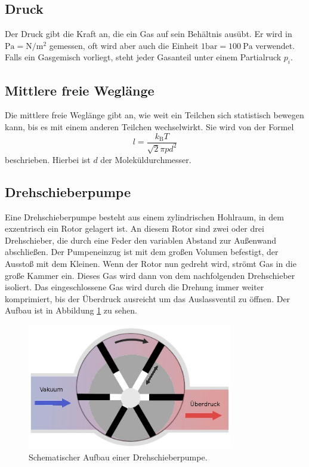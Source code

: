 \subsection{Druck}
Der Druck gibt die Kraft an, die ein Gas auf sein Behältnis ausübt. Er wird in $\si{\pascal}=\si{\newton \per \meter \squared}$ gemessen, oft wird aber auch die Einheit $1 \si{\bar}=\SI{100}{\pascal}$ verwendet. Falls ein Gasgemisch
vorliegt, steht jeder Gasanteil unter einem Partialruck $p_i$.
\subsection{Mittlere freie Weglänge}
Die mittlere freie Weglänge gibt an, wie weit ein Teilchen sich statistisch bewegen kann, bis es mit einem anderen Teilchen wechselwirkt.
Sie wird von der Formel
\begin{equation}
	l=\frac{k_\text{B}T}{\sqrt{2}\pi p d^2}
\end{equation}
beschrieben. Hierbei ist $d$ der Moleküldurchmesser.

\subsection{Drehschieberpumpe}
Eine Drehschieberpumpe besteht aus einem zylindrischen Hohlraum, in dem exzentrisch ein Rotor gelagert ist. An diesem Rotor sind zwei oder drei Drehschieber,
die durch eine Feder den variablen Abstand zur Außenwand abschließen. Der Pumpeneinzug ist mit dem großen Volumen befestigt, der Ausstoß mit dem Kleinen.
Wenn der Rotor nun gedreht wird, strömt Gas in die große Kammer ein. Dieses Gas wird dann von dem nachfolgenden Drehschieber isoliert. Das eingeschlossene Gas wird
durch die Drehung immer weiter komprimiert, bis der Überdruck ausreicht um das Auslassventil zu öffnen. Der Aufbau ist in Abbildung \ref{img:drehpump} zu sehen.
\begin{figure}
	\centering
	\includegraphics[width=0.8\textwidth]{img/drehpump.jpg}
	\caption{Schematischer Aufbau einer Drehschieberpumpe\cite{hoechs}.}
	\label{img:drehpump}
\end{figure}
